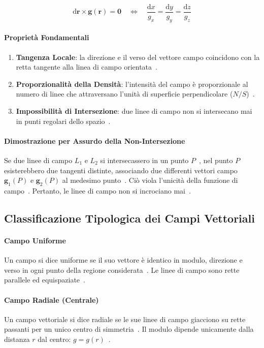 \documentclass[12pt, a4paper]{article}
\begin{document}
\[
\text{d}\mathbf{r} \times \mathbf{g}(\mathbf{r}) = \mathbf{0} \quad \iff \quad \frac{\text{d}x}{g_x} = \frac{\text{d}y}{g_y} = \frac{\text{d}z}{g_z}
\]

\paragraph{Proprietà Fondamentali}
\begin{enumerate}
    \item \textbf{Tangenza Locale}: la direzione e il verso del vettore campo coincidono con la retta tangente alla linea di campo orientata~\cite{2}.
    \item \textbf{Proporzionalità della Densità}: l'intensità del campo è proporzionale al numero di linee che attraversano l'unità di superficie perpendicolare ($N/S$)~\cite{2}.
    \item \textbf{Impossibilità di Intersezione}: due linee di campo non si intersecano mai in punti regolari dello spazio~\cite{2}.
\end{enumerate}

\paragraph{Dimostrazione per Assurdo della Non-Intersezione}
Se due linee di campo $L_1$ e $L_2$ si intersecassero in un punto $P$~\cite{2}, nel punto $P$ esisterebbero due tangenti distinte, associando due differenti vettori campo $\mathbf{g}_1(P)$ e $\mathbf{g}_2(P)$ al medesimo punto~\cite{2}. Ciò viola l'unicità della funzione di campo~\cite{1, 2}. Pertanto, le linee di campo non si incrociano mai~\cite{2}.

\subsection{Classificazione Tipologica dei Campi Vettoriali}

\paragraph{Campo Uniforme}
Un campo si dice uniforme se il suo vettore è identico in modulo, direzione e verso in ogni punto della regione considerata~\cite{2}. Le linee di campo sono rette parallele ed equispaziate~\cite{2}.

\paragraph{Campo Radiale (Centrale)}
Un campo vettoriale si dice radiale se le sue linee di campo giacciono su rette passanti per un unico centro di simmetria~\cite{2}. Il modulo dipende unicamente dalla distanza $r$ dal centro: $g = g(r)$~\cite{2}.
\end{document}
